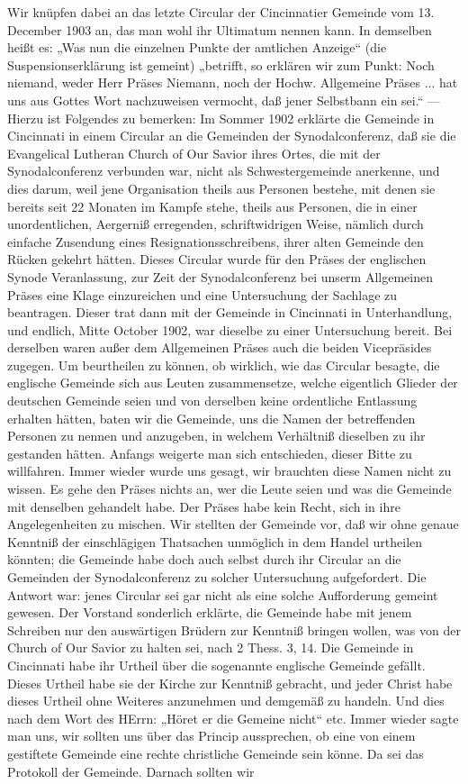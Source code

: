 Wir knüpfen dabei an das letzte Circular der Cincinnatier Gemeinde vom 13. December 1903 an, das man wohl ihr Ultimatum nennen kann. In demselben heißt es: „Was nun die einzelnen Punkte der amtlichen Anzeige“ (die Suspensionserklärung ist gemeint) „betrifft, so erklären wir zum  Punkt: Noch niemand, weder Herr Präses Niemann, noch der Hochw. Allgemeine Präses ... hat uns aus Gottes Wort nachzuweisen vermocht, daß jener Selbstbann ein  sei.“ — Hierzu ist Folgendes zu bemerken: Im Sommer 1902 erklärte die Gemeinde in Cincinnati in einem Circular an die Gemeinden der Synodalconferenz, daß sie die Evangelical Lutheran Church of Our Savior ihres Ortes, die mit der Synodalconferenz verbunden war, nicht als Schwestergemeinde anerkenne, und dies darum, weil jene Organisation theils aus Personen bestehe, mit denen sie bereits seit 22 Monaten im Kampfe stehe, theils aus Personen, die in einer unordentlichen, Aergerniß erregenden, schriftwidrigen Weise, nämlich durch einfache Zusendung eines Resignationsschreibens, ihrer alten Gemeinde den Rücken gekehrt hätten. Dieses Circular wurde für den Präses der englischen Synode Veranlassung, zur Zeit der Synodalconferenz bei unserm Allgemeinen Präses eine Klage einzureichen und eine Untersuchung der Sachlage zu beantragen. Dieser trat dann mit der Gemeinde in Cincinnati in Unterhandlung, und endlich, Mitte October 1902, war dieselbe zu einer Untersuchung bereit. Bei derselben waren außer dem Allgemeinen Präses auch die beiden Vicepräsides zugegen. Um beurtheilen zu können, ob wirklich, wie das Circular besagte, die englische Gemeinde sich aus Leuten zusammensetze, welche eigentlich Glieder der deutschen Gemeinde seien und von derselben keine ordentliche Entlassung erhalten hätten, baten wir die Gemeinde, uns die Namen der betreffenden Personen zu nennen und anzugeben, in welchem Verhältniß dieselben zu ihr gestanden hätten. Anfangs weigerte man sich entschieden, dieser Bitte zu willfahren. Immer wieder wurde uns gesagt, wir brauchten diese Namen nicht zu wissen. Es gehe den Präses nichts an, wer die Leute seien und was die Gemeinde mit denselben gehandelt habe. Der Präses habe kein Recht, sich in ihre Angelegenheiten zu mischen. Wir stellten der Gemeinde vor, daß wir ohne genaue Kenntniß der einschlägigen Thatsachen unmöglich in dem Handel urtheilen könnten; die Gemeinde habe doch auch selbst durch ihr Circular an die Gemeinden der Synodalconferenz zu solcher Untersuchung aufgefordert. Die Antwort war: jenes Circular sei gar nicht als eine solche Aufforderung gemeint gewesen. Der Vorstand sonderlich erklärte, die Gemeinde habe mit jenem Schreiben nur den auswärtigen Brüdern zur Kenntniß bringen wollen, was von der Church of Our Savior zu halten sei, nach 2 Thess. 3, 14. Die Gemeinde in Cincinnati habe ihr Urtheil über die sogenannte englische Gemeinde gefällt. Dieses Urtheil habe sie der Kirche zur Kenntniß gebracht, und jeder Christ habe dieses Urtheil ohne Weiteres anzunehmen und demgemäß zu handeln. Und dies nach dem Wort des HErrn: „Höret er die Gemeine nicht“ etc. Immer wieder sagte man uns, wir sollten uns über das Princip aussprechen, ob eine von einem  gestiftete Gemeinde eine rechte christliche Gemeinde sein könne. Da sei das Protokoll der Gemeinde. Darnach sollten wir 